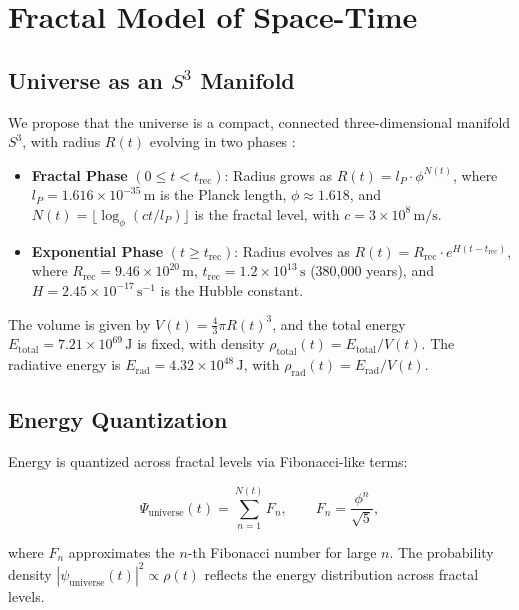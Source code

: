 \documentclass[12pt,a4paper]{article}
\begin{document}
\section{Fractal Model of Space-Time}

\subsection{Universe as an \texorpdfstring{\(S^3\)}{S3} Manifold}

We propose that the universe is a compact, connected three-dimensional manifold \(S^3\), with radius \(R(t)\) evolving in two phases \cite{preece_batenin_2025}:

\begin{itemize}
  \item \textbf{Fractal Phase} \((0 \leq t < t_{\mathrm{rec}})\): Radius grows as \(R(t) = l_P \cdot \phi^{N(t)}\), where \(l_P = 1.616 \times 10^{-35}\,\mathrm{m}\) is the Planck length, \(\phi \approx 1.618\), and \(N(t) = \lfloor \log_{\phi}(ct/l_P) \rfloor\) is the fractal level, with \(c = 3 \times 10^8\,\mathrm{m/s}\).
  \item \textbf{Exponential Phase} \((t \geq t_{\mathrm{rec}})\): Radius evolves as \(R(t) = R_{\mathrm{rec}} \cdot e^{H(t-t_{\mathrm{rec}})}\), where \(R_{\mathrm{rec}} = 9.46 \times 10^{20}\,\mathrm{m}\), \(t_{\mathrm{rec}} = 1.2 \times 10^{13}\,\mathrm{s}\) (380,000 years), and \(H = 2.45 \times 10^{-17}\,\mathrm{s}^{-1}\) is the Hubble constant.
\end{itemize}

The volume is given by \(V(t) = \frac{4}{3}\pi R(t)^3\), and the total energy \(E_{\mathrm{total}} = 7.21 \times 10^{69}\,\mathrm{J}\) is fixed, with density \(\rho_{\mathrm{total}}(t) = E_{\mathrm{total}}/V(t)\). The radiative energy is \(E_{\mathrm{rad}} = 4.32 \times 10^{48}\,\mathrm{J}\), with \(\rho_{\mathrm{rad}}(t) = E_{\mathrm{rad}}/V(t)\).

\subsection{Energy Quantization}

Energy is quantized across fractal levels via Fibonacci-like terms:

\begin{equation}
\Psi_{\mathrm{universe}}(t) = \sum_{n=1}^{N(t)} F_n, \qquad F_n = \frac{\phi^n}{\sqrt{5}},
\end{equation}

where \(F_n\) approximates the \(n\)-th Fibonacci number for large \(n\). The probability density \(|\psi_{\mathrm{universe}}(t)|^2 \propto \rho(t)\) reflects the energy distribution across fractal levels.
\end{document}
